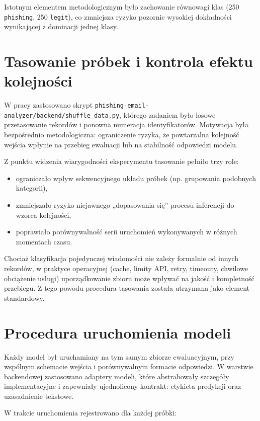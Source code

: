 \documentclass[12pt,a4paper,openany]{report}
\begin{document}
Istotnym elementem metodologicznym było zachowanie równowagi klas (250 \texttt{phishing}, 250 \texttt{legit}), co zmniejsza ryzyko pozornie wysokiej dokładności wynikającej z dominacji jednej klasy.

\section{Tasowanie próbek i kontrola efektu kolejności}

W pracy zastosowano skrypt \texttt{phishing-email-analyzer/backend/shuffle\_data.py}, którego zadaniem było losowe przetasowanie rekordów i ponowna numeracja identyfikatorów. Motywacja była bezpośrednio metodologiczna: ograniczenie ryzyka, że powtarzalna kolejność wejścia wpłynie na przebieg ewaluacji lub na stabilność odpowiedzi modelu.

Z punktu widzenia wiarygodności eksperymentu tasowanie pełniło trzy role:

\begin{itemize}
    \item ograniczało wpływ sekwencyjnego układu próbek (np. grupowania podobnych kategorii),
    \item zmniejszało ryzyko niejawnego „dopasowania się” procesu inferencji do wzorca kolejności,
    \item poprawiało porównywalność serii uruchomień wykonywanych w różnych momentach czasu.
\end{itemize}

Chociaż klasyfikacja pojedynczej wiadomości nie zależy formalnie od innych rekordów, w praktyce operacyjnej (cache, limity API, retry, timeouty, chwilowe obciążenie usługi) uporządkowanie zbioru może wpływać na jakość i kompletność przebiegu. Z tego powodu procedura tasowania została utrzymana jako element standardowy.

\section{Procedura uruchomienia modeli}

Każdy model był uruchamiany na tym samym zbiorze ewaluacyjnym, przy wspólnym schemacie wejścia i porównywalnym formacie odpowiedzi. W warstwie backendowej zastosowano adaptery modeli, które abstrahowały szczegóły implementacyjne i zapewniały ujednolicony kontrakt: etykieta predykcji oraz uzasadnienie tekstowe.

W trakcie uruchomienia rejestrowano dla każdej próbki:
\end{document}

